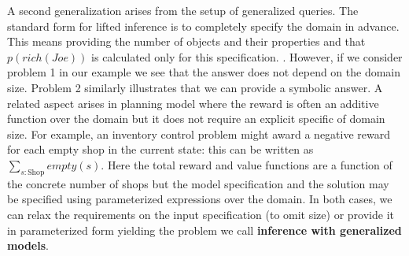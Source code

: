 {A second generalization arises from the setup of generalized
queries. The standard form for lifted inference is to completely
specify the domain in advance. This means providing the number of
objects and their properties and that $p(rich(Joe))$ is calculated
only for this specification. . However, if we consider problem 1 in our example we see
that the answer does not depend on the domain size. Problem 2
similarly illustrates that we can provide a symbolic answer.  A
related aspect arises in planning model where the reward is often an
additive function over the domain but it does not require an explicit
specific of domain size. For example, an inventory control problem
might award a negative reward for each empty shop in the current
state: this can be written as $\sum_{s:\mbox{Shop}} empty(s)$. Here
the total reward and value functions are a function of the concrete
number of shops but the model specification and the solution may be
specified using parameterized expressions over the domain.  In both
cases, we can relax the requirements on the input specification (to
omit size) or provide it in parameterized form yielding the problem we
call {\bf inference with generalized models}.
}













